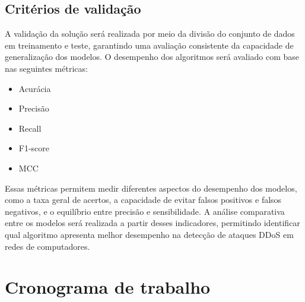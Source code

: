 \documentclass[
    12pt,                %
    openright,           %
    oneside,             %
    a4paper,             %
    english,             %
    brazil               %
]{abntex2}
\begin{document}
\subsection{Critérios de validação} A validação da solução será realizada por meio da divisão do conjunto de dados em treinamento e teste, garantindo uma avaliação consistente da capacidade de generalização dos modelos.
O desempenho dos algoritmos será avaliado com base nas seguintes métricas:

\begin{itemize}
    \item Acurácia
    \item Precisão
    \item Recall
    \item F1-score
    \item MCC
\end{itemize}

Essas métricas permitem medir diferentes aspectos do desempenho dos modelos, como a taxa geral de acertos, a capacidade de evitar falsos positivos e falsos negativos, e o equilíbrio entre precisão e sensibilidade.
A análise comparativa entre os modelos será realizada a partir desses indicadores, permitindo identificar qual algoritmo apresenta melhor desempenho na detecção de ataques DDoS em redes de computadores.






\section{Cronograma de trabalho}
\label{sec:cronograma}

\end{document}
